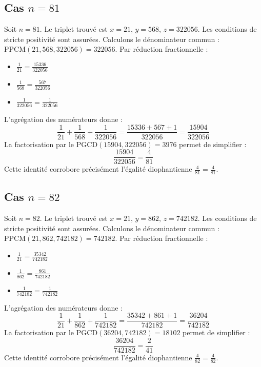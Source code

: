\documentclass[11pt,a4paper]{article}
\begin{document}
\subsection{Cas $n = 81$}
Soit $n = 81$. Le triplet trouvé est $x = 21$, $y = 568$, $z = 322056$.
Les conditions de stricte positivité sont assurées.
Calculons le dénominateur commun : $\text{PPCM}(21, 568, 322056) = 322056$.
Par réduction fractionnelle :
\begin{itemize}
    \item $\frac{1}{21} = \frac{15336}{322056}$
    \item $\frac{1}{568} = \frac{567}{322056}$
    \item $\frac{1}{322056} = \frac{1}{322056}$
\end{itemize}
L'agrégation des numérateurs donne :
$$ \frac{1}{21} + \frac{1}{568} + \frac{1}{322056} = \frac{15336 + 567 + 1}{322056} = \frac{15904}{322056} $$
La factorisation par le $\text{PGCD}(15904, 322056) = 3976$ permet de simplifier :
$$ \frac{15904}{322056} = \frac{4}{81} $$
Cette identité corrobore précisément l'égalité diophantienne $\frac{4}{81} = \frac{4}{81}$.

\subsection{Cas $n = 82$}
Soit $n = 82$. Le triplet trouvé est $x = 21$, $y = 862$, $z = 742182$.
Les conditions de stricte positivité sont assurées.
Calculons le dénominateur commun : $\text{PPCM}(21, 862, 742182) = 742182$.
Par réduction fractionnelle :
\begin{itemize}
    \item $\frac{1}{21} = \frac{35342}{742182}$
    \item $\frac{1}{862} = \frac{861}{742182}$
    \item $\frac{1}{742182} = \frac{1}{742182}$
\end{itemize}
L'agrégation des numérateurs donne :
$$ \frac{1}{21} + \frac{1}{862} + \frac{1}{742182} = \frac{35342 + 861 + 1}{742182} = \frac{36204}{742182} $$
La factorisation par le $\text{PGCD}(36204, 742182) = 18102$ permet de simplifier :
$$ \frac{36204}{742182} = \frac{2}{41} $$
Cette identité corrobore précisément l'égalité diophantienne $\frac{4}{82} = \frac{4}{82}$.
\end{document}
